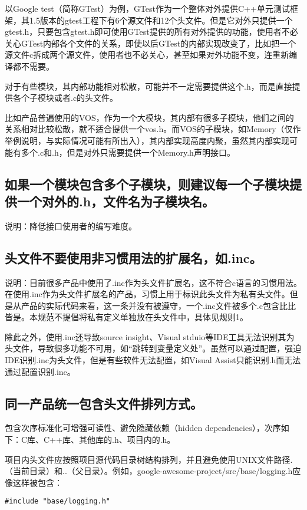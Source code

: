 以Google test（简称GTest）为例，GTest作为一个整体对外提供C++单元测试框架，其1.5版本的gtest工程下有6个源文件和12个头文件。但是它对外只提供一个gtest.h，只要包含gtest.h即可使用GTest提供的所有对外提供的功能，使用者不必关心GTest内部各个文件的关系，即使以后GTest的内部实现改变了，比如把一个源文件c拆成两个源文件，使用者也不必关心，甚至如果对外功能不变，连重新编译都不需要。

对于有些模块，其内部功能相对松散，可能并不一定需要提供这个.h，而是直接提供各个子模块或者.c的头文件。

比如产品普遍使用的VOS，作为一个大模块，其内部有很多子模块，他们之间的关系相对比较松散，就不适合提供一个vos.h。而VOS的子模块，如Memory（仅作举例说明，与实际情况可能有所出入），其内部实现高度内聚，虽然其内部实现可能有多个.c和.h，但是对外只需要提供一个Memory.h声明接口。


\subsection{如果一个模块包含多个子模块，则建议每一个子模块提供一个对外的.h，文件名为子模块名。}
说明：降低接口使用者的编写难度。


\subsection{头文件不要使用非习惯用法的扩展名，如.inc。}
说明：目前很多产品中使用了.inc作为头文件扩展名，这不符合c语言的习惯用法。在使用.inc作为头文件扩展名的产品，习惯上用于标识此头文件为私有头文件。但是从产品的实际代码来看，这一条并没有被遵守，一个.inc文件被多个.c包含比比皆是。本规范不提倡将私有定义单独放在头文件中，具体见规则1。

除此之外，使用.inc还导致source insight、Visual stduio等IDE工具无法识别其为头文件，导致很多功能不可用，如“跳转到变量定义处”。虽然可以通过配置，强迫IDE识别.inc为头文件，但是有些软件无法配置，如Visual Assist只能识别.h而无法通过配置识别.inc。


\subsection{同一产品统一包含头文件排列方式。}
包含次序标准化可增强可读性、避免隐藏依赖（hidden dependencies），次序如下：C库、C++库、其他库的.h、项目内的.h。

项目内头文件应按照项目源代码目录树结构排列，并且避免使用UNIX文件路径.（当前目录）和..（父目录）。例如，google-awesome-project/src/base/logging.h应像这样被包含：
\begin{verbatim}
#include "base/logging.h"
\end{verbatim}

